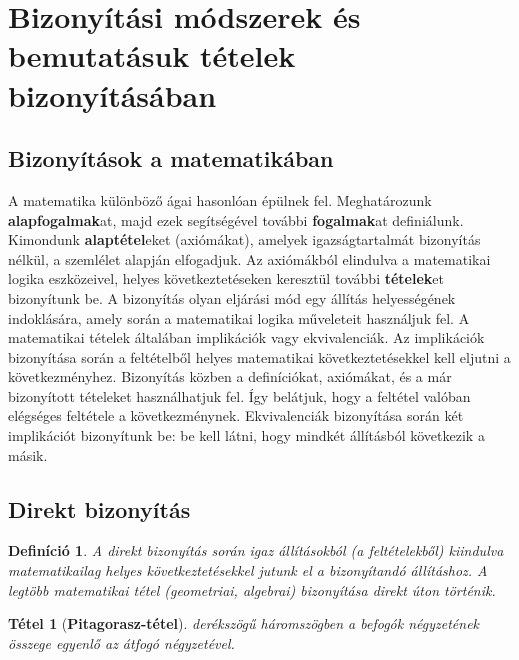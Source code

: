 \documentclass[12pt,a4paper]{article}
\newtheorem{theorem}{Tétel} [section]
\newtheorem{definition}{Definíció} [section]
\begin{document}
\newpage










\section{Bizonyítási módszerek és bemutatásuk tételek bizonyításában}
\subsection{Bizonyítások a matematikában}
A matematika különböző ágai hasonlóan épülnek fel. Meghatározunk \textbf{alapfogalmak}at, majd ezek segítségével további \textbf{fogalmak}at definiálunk. Kimondunk \textbf{alaptétel}eket (axiómákat), amelyek igazságtartalmát bizonyítás nélkül, a szemlélet alapján elfogadjuk. Az axiómákból elindulva a matematikai logika eszközeivel, helyes következtetéseken keresztül további \textbf{tételek}et bizonyítunk be. A bizonyítás olyan eljárási mód egy állítás helyességének indoklására, amely során a matematikai logika műveleteit használjuk fel. A matematikai tételek általában implikációk vagy ekvivalenciák. Az implikációk bizonyítása során a feltételből helyes matematikai következtetésekkel kell eljutni a következményhez. Bizonyítás közben a definíciókat, axiómákat, és a már bizonyított tételeket használhatjuk fel. Így belátjuk, hogy a feltétel valóban elégséges feltétele a következménynek. Ekvivalenciák bizonyítása során két implikációt bizonyítunk be: be kell látni, hogy mindkét állításból következik a másik.

\subsection{Direkt bizonyítás}

\begin{definition}
A direkt bizonyítás során igaz állításokból (a feltételekből) kiindulva matematikailag helyes következtetésekkel jutunk el a bizonyítandó állításhoz. A legtöbb matematikai tétel (geometriai, algebrai) bizonyítása direkt úton történik.
\end{definition}

\begin{theorem}[\textbf{Pitagorasz-tétel}]
derékszögű háromszögben a befogók négyzetének összege egyenlő az átfogó négyzetével.
\end{theorem}
\end{document}
